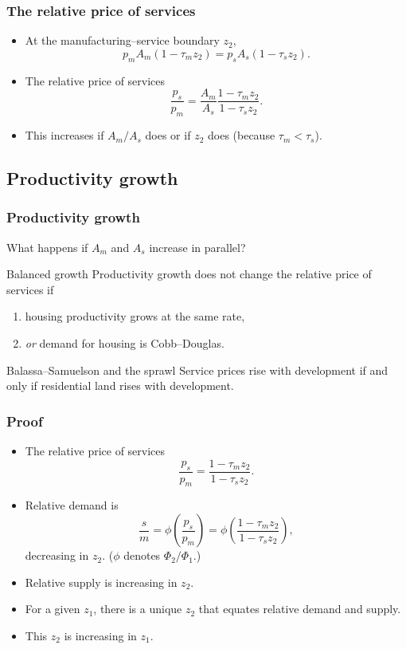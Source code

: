 \documentclass[handout,compress,mathserif]{beamer}
\begin{document}
\begin{frame}\frametitle{The relative price of services}
\begin{itemize}
    \item At the manufacturing--service boundary $z_2$,
    \[
    p_mA_m(1-\tau_m z_2) = p_sA_s(1-\tau_s z_2).
    \]
    \item The relative price of services
    \[
    \frac{p_s}{p_m} = \frac{A_m}{A_s}\frac{1-\tau_m z_2}{1-\tau_s z_2}.
    \]
    \item This increases if $A_m/A_s$ does or if $z_2$ does (because $\tau_m<\tau_s$).
\end{itemize}
\end{frame}

\subsection{Productivity growth}


\begin{frame}\frametitle{Productivity growth}
What happens if  $A_m$ and $A_s$ increase in parallel?\pause
\begin{block}{Balanced growth}
Productivity growth does not change the relative price of services if
    \begin{enumerate}
      \item housing productivity grows at the same rate,
      \item \emph{or} demand for housing is Cobb--Douglas.
    \end{enumerate}
\end{block}
\pause
\begin{block}{Balassa--Samuelson and the sprawl}
Service prices rise with development if and only if residential land rises with development.
\end{block}
\end{frame}



\begin{frame}\frametitle{Proof}
\begin{itemize}
    \item The relative price of services
    \[
    \frac{p_s}{p_m} = \frac{1-\tau_m z_2}{1-\tau_s z_2}.
    \]
    \item Relative demand is
    \[
    \frac{s}{m} = \phi\left(\frac{p_s}{p_m}\right) = \phi\left(\frac{1-\tau_m z_2}{1-\tau_s z_2}\right),
    \]
    decreasing in $z_2$. ($\phi$ denotes $\Phi_2/\Phi_1$.)
    \item Relative supply is increasing in $z_2$. 
    \item For a given $z_1$, there is a unique $z_2$ that equates relative demand and supply. 
    \item This $z_2$ is increasing in $z_1$.
\end{itemize}
\end{frame}
\end{document}
